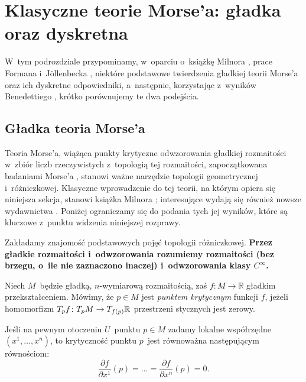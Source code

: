 
\section{Klasyczne teorie Morse'a: gładka oraz dyskretna}\label{chap3-sec1}
W~tym podrozdziale przypominamy, w~oparciu o~książkę Milnora \cite{Milnor63}, prace Formana \cite{Forman98} i~J{\"o}llenbecka \cite{Jollenbeck05}, niektóre podstawowe twierdzenia gładkiej teorii Morse'a oraz ich dyskretne odpowiedniki, a~następnie, korzystając z~wyników Benedettiego \cite{Benedetti13}, krótko porównujemy te dwa podejścia.

\subsection{Gładka teoria Morse'a}
Teoria Morse'a, wiążąca punkty krytyczne odwzorowania gładkiej rozmaitości w~zbiór liczb rzeczywistych z~topologią tej rozmaitości, zapoczątkowana badaniami Morse'a \cite{Morse25}, stanowi ważne narzędzie topologii geometrycznej i~różniczkowej.  Klasyczne wprowadzenie do tej teorii, na którym opiera się niniejsza sekcja, stanowi książka Milnora \cite{Milnor63}; interesujące wydają się również nowsze wydawnictwa \cite{Banyaga04,Nicolaescu11}. Poniżej ograniczamy się do podania tych jej wyników, które są kluczowe z~punktu widzenia niniejszej rozprawy.

Zakładamy znajomość podstawowych pojęć topologii różniczkowej. \textbf{Przez gładkie rozmaitości i~odwzorowania rozumiemy rozmaitości (bez brzegu, o~ile nie zaznaczono inaczej) i~odwzorowania klasy $C^\infty$.} 

Niech $M$~będzie gładką, $n$-wymiarową rozmaitością, zaś $f\colon M\to \mathbb{R}$ gładkim przekształceniem. Mówimy, że $p\in M$ jest \textit{punktem krytycznym} funkcji $f$, jeżeli homomorfizm $T_p f\colon T_p M\to T_{f(p)} \mathbb{R}$ przestrzeni stycznych jest zerowy.

Jeśli na pewnym otoczeniu $U$~punktu $p\in M$ zadamy lokalne współrzędne $\left(x^1,\ldots,x^n\right)$, to krytyczność punktu $p$~jest równoważna następującym równościom:
\[\frac{\partial f}{\partial x^1}(p)=\ldots=\frac{\partial f}{\partial x^n}(p)=0.\]

